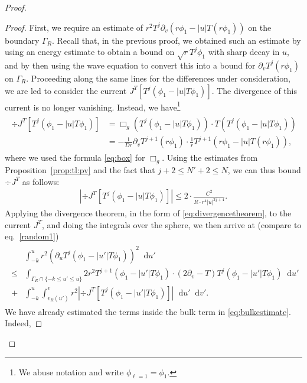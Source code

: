 \documentclass[11pt,english]{article}
\numberwithin{equation}{section}
\theoremstyle{remark}
\theoremstyle{plain}
\theoremstyle{remark}
\newcommand{\dd}{\mathop{}\!\mathrm{d}}
\newcommand{\pu}{\partial_u}
\newcommand{\pv}{\partial_v}
\renewcommand{\(}{\left(}
\renewcommand{\)}{\right)}
\begin{document}
\begin{proof}
\begin{proof}
First, we require an estimate of $r^2T^j\pv(r\phi_1-|u|T(r\phi_1))$ on the boundary $\Gamma_R$. 
Recall that, in the previous proof, we obtained such an estimate by using an energy estimate to obtain a bound on $\sqrt{r}T^j\phi_1$ with sharp decay in $u$, and by then using the wave equation to convert this into a bound for $\pv T^j(r\phi_1)$ on $\Gamma_R$. 
Proceeding along the same lines for the differences under consideration, we are led to consider the current $J^T[T^j(\phi_1-|u|T\phi_1)]$. The divergence of this current is no longer vanishing. Instead, we have\footnote{We abuse notation and write $\phi_{\ell=1}=\phi_1$.}
\newcommand{\pvv}{r^2T^j\pv(r\phi_1-|u|T(r\phi_1))}
\begin{align}
\begin{split}
\div J^T\left[T^j\left(\phi_1-|u|T\phi_1\right)\right]&=\Box_g\left(T^j\left(\phi_1-|u|T\phi_1\right)\right)\cdot T\left(T^j\left(\phi_1-|u|T\phi_1\right)\right)\\
&=-\frac{1}{Dr}\pv T^{j+1}(r\phi_1)\cdot\frac{1}{r}T^{j+1}\left(r\phi_1-|u|T(r\phi_1)\right),
\end{split}
\end{align}
where we used the formula \eqref{eq:box} for $\Box_g$. Using the estimates from Proposition~\ref{prop:tl:pv} and the fact that $j+2\leq N'+2\leq N$, we can thus bound $\div J^T$ as follows:
\begin{align}\label{eq:bulkestimate}
\left|\div J^T\left[T^j\left(\phi_1-|u|T\phi_1\right)\right]\right|\leq 2\cdot\frac{C^2}{R\cdot r^{4}|u|^{2j+4}}.
\end{align}
Applying the divergence theorem, in the form of \eqref{eq:divergencetheorem},  to the current $J^T$, and doing the integrals over the sphere, we then arrive at (compare to eq.\ \eqref{random1})
\begin{align}\label{proof5.6z}
\begin{split}
&\int_{-k}^u r^2\left(\pu T^j(\phi_1-|u'|T\phi_1)\right)^2\dd u'	 \\
\leq &\int_{\Gamma_R\cap\{-k\leq u'\leq u\}}  2r^2 T^{j+1}(\phi_1-|u'|T\phi_1)\cdot (2\pv-T)T^j(\phi_1-|u'|T\phi_1)	 \dd u'\\
+&\int_{-k}^u\int_{v_R(u')}^v r^2\left|\div J^T\left[T^j(\phi_1-|u'|T\phi_1)\right]\right|\dd u'\dd v'.
\end{split}
\end{align}
We have already estimated the terms inside the bulk term in \eqref{eq:bulkestimate}. Indeed, 

\end{proof}
\end{proof}
\end{document}
